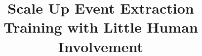 \documentclass[letterpaper]{article} %
\begin{document}
%
\title{Scale Up Event Extraction Training with Little Human Involvement}
\author{}
\maketitle











\end{document}
